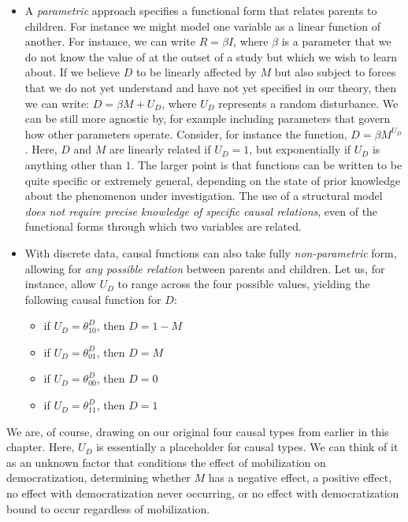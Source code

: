 \documentclass[
  12pt,
]{book}
\providecommand{\tightlist}{%
  \setlength{\itemsep}{0pt}\setlength{\parskip}{0pt}}
\begin{document}
\begin{itemize}
\tightlist
\item
  A \emph{parametric} approach specifies a functional form that relates parents to children. For instance we might model one variable as a linear function of another. For instance, we can write \(R=\beta I\), where \(\beta\) is a parameter that we do not know the value of at the outset of a study but which we wish to learn about. If we believe \(D\) to be linearly affected by \(M\) but also subject to forces that we do not yet understand and have not yet specified in our theory, then we can write: \(D=\beta M+U_D\), where \(U_D\) represents a random disturbance. We can be still more agnostic by, for example including parameters that govern how other parameters operate. Consider, for instance the function, \(D=\beta M^{U_D}\). Here, \(D\) and \(M\) are linearly related if \(U_D=1\), but exponentially if \(U_D\) is anything other than \(1\). The larger point is that functions can be written to be quite specific or extremely general, depending on the state of prior knowledge about the phenomenon under investigation. The use of a structural model \emph{does not require precise knowledge of specific causal relations}, even of the functional forms through which two variables are related.
\end{itemize}

\begin{itemize}
\tightlist
\item
  With discrete data, causal functions can also take fully \emph{non-parametric} form, allowing for \emph{any possible relation} between parents and children. Let us, for instance, allow \(U_D\) to range across the four possible values, yielding the following causal function for \(D\):

  \begin{itemize}
  \tightlist
  \item
    if \(U_D=\theta^D_{10}\), then \(D=1-M\)
  \item
    if \(U_D=\theta^D_{01}\), then \(D=M\)
  \item
    if \(U_D=\theta^D_{00}\), then \(D=0\)
  \item
    if \(U_D=\theta^D_{11}\), then \(D=1\)
  \end{itemize}
\end{itemize}

We are, of course, drawing on our original four causal types from earlier in this chapter. Here, \(U_D\) is essentially a placeholder for causal types. We can think of it as an unknown factor that conditions the effect of mobilization on democratization, determining whether \(M\) has a negative effect, a positive effect, no effect with democratization never occurring, or no effect with democratization bound to occur regardless of mobilization.
\end{document}
